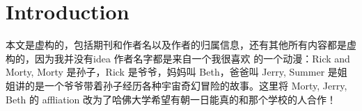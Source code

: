 \documentclass[journal]{IEEEtran}
\begin{document}
\IEEEpeerreviewmaketitle



\section{Introduction}

本文是虚构的，包括期刊和作者名以及作者的归属信息，还有其他所有内容都是虚构的，因为我并没有idea
作者名字都是来自一个我很喜欢
的一个动漫：Rick and Morty, Morty 是孙子，Rick 是爷爷，妈妈叫 Beth，爸爸叫 Jerry,
 Summer 是姐姐讲的是一个爷爷带着孙子经历各种宇宙奇幻冒险的故事。这里将 Morty, Jerry,
  Beth 的 affliation 改为了哈佛大学希望有朝一日能真的和那个学校的人合作！



\end{document}
